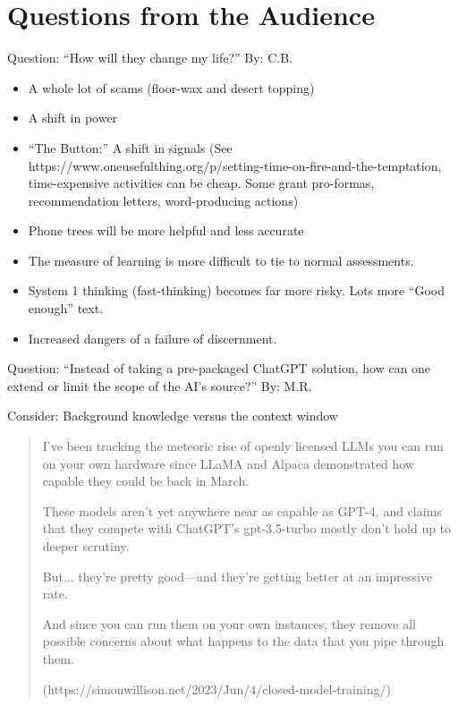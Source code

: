 \documentclass[aspectratio=169]{beamer}
\begin{document}
\section{Questions from the Audience}
\begin{frame}{Question: ``How will they change my life?'' By: C.B.}
\begin{itemize}
    \item A whole lot of scams (floor-wax and desert topping)
    \item A shift in power
    \item ``The Button:'' A shift in signals (See https://www.oneusefulthing.org/p/setting-time-on-fire-and-the-temptation, time-expensive activities can be cheap. Some grant pro-formas, recommendation letters, word-producing actions)
    \item Phone trees will be more helpful and less accurate
    \item The measure of learning is more difficult to tie to normal assessments.
    \item System 1 thinking (fast-thinking) becomes far more risky. Lots more ``Good enough'' text. 
    \item Increased dangers of a failure of discernment.
\end{itemize}
    
\end{frame}

\begin{frame}{Question: ``Instead of taking a pre-packaged ChatGPT solution, how can one extend or limit the scope of the AI's source?'' By: M.R.
}

Consider: Background knowledge versus the context window        

\begin{quote}
I’ve been tracking the meteoric rise of openly licensed LLMs you can run on your own hardware since LLaMA and Alpaca demonstrated how capable they could be back in March.

These models aren’t yet anywhere near as capable as GPT-4, and claims that they compete with ChatGPT’s gpt-3.5-turbo mostly don’t hold up to deeper scrutiny.

But... they’re pretty good—and they’re getting better at an impressive rate.

And since you can run them on your own instances, they remove all possible concerns about what happens to the data that you pipe through them.

(https://simonwillison.net/2023/Jun/4/closed-model-training/)
        \end{quote}
\end{frame}
\end{document}
